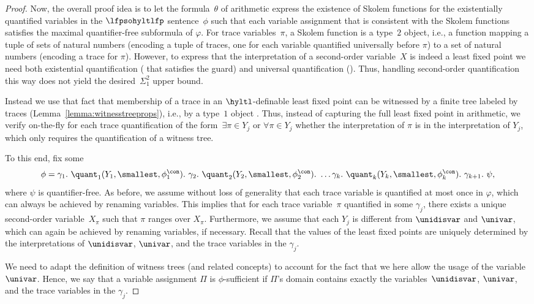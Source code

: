 \begin{proof}
Now, the overall proof idea is to let the formula~$\theta$ of arithmetic express the existence of Skolem functions for the existentially quantified variables in the $\lfpsohyltlfp$ sentence~$\phi$ such that each variable assignment that is consistent with the Skolem functions satisfies the maximal quantifier-free subformula of $\varphi$.
For trace variables~$\pi$, a Skolem function is a type~$2$ object, i.e., a function mapping a tuple of sets of natural numbers (encoding a tuple of traces, one for each variable quantified universally before $\pi$) to a set of natural numbers (encoding a trace for $\pi$).
However, to express that the interpretation of a second-order variable~$X$ is indeed a least fixed point we need both existential quantification ( that satisfies the guard) and universal quantification ().
Thus, handling second-order quantification this way does not yield the desired~$\Sigma_1^2$ upper bound. 

Instead we use that fact that membership of a trace in an $\hyltl$-definable least fixed point can be witnessed by a finite tree labeled by traces (Lemma~\ref{lemma:witnesstreeprops}), i.e., by a type~$1$ object .
Thus, instead of capturing the full least fixed point in arithmetic, we verify on-the-fly for each trace quantification of the form~$\exists \pi \in Y_j$ or $\forall \pi \in Y_j$ whether the interpretation of $\pi$ is in the interpretation of $Y_j$, which only requires the quantification of a witness tree.

To this end, fix some \[
\phi = 
\gamma_1.\ \quant_1(Y_1, \smallest, \phi_1^\con).\ 
\gamma_2.\ \quant_2(Y_2, \smallest, \phi_2^\con).\ 
\ldots 
\gamma_k.\ \quant_k(Y_k, \smallest, \phi_k^\con).\
\gamma_{k+1}.\
\psi,
\]
where $\psi$ is quantifier-free.
As before, we assume without loss of generality that each trace variable is quantified at most once in $\varphi$, which can always be achieved by renaming variables. This implies that for each trace variable~$\pi$ quantified in some $\gamma_j$, there exists a unique second-order variable~$X_\pi$ such that $\pi$ ranges over $X_\pi$. 
Furthermore, we assume that each $Y_j$ is different from $\unidisvar$ and $\univar$, which can again be achieved by renaming variables, if necessary.
Recall that the values of the least fixed points are uniquely determined by the interpretations of $\unidisvar$, $\univar$, and the trace variables in the $\gamma_j$. 

We need to adapt the definition of witness trees (and related concepts) to account for the fact that we here allow the usage of the variable~$\univar$.
Hence, we say that a variable assignment $\Pi$ is $\phi$-sufficient if $\Pi$'s domain contains exactly the variables~$\unidisvar$, $\univar$, and the trace variables in the $\gamma_j$. 


\end{proof}
